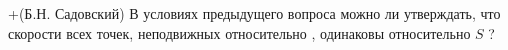 +(Б.Н. Садовский)
В условиях предыдущего вопроса можно ли утверждать, что скорости
всех точек, неподвижных относительно  , одинаковы относительно $S$ ?
